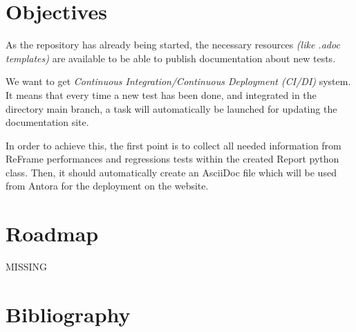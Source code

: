 \documentclass[12pt]{article}
\begin{document}
\newpage
\section{Objectives}
As the repository has already being started, the necessary resources \textit{(like .adoc templates)} are available
to be able to publish documentation about new tests.

We want to get \textit{Continuous Integration/Continuous Deployment (CI/DI)} system.
It means that every time a new test has been done, and integrated in the directory main branch, a task will 
automatically be launched for updating the documentation site.

In order to achieve this, the first point is to collect all needed information from ReFrame performances and regressions tests
within the created Report python class. Then, it should automatically create an AsciiDoc file which will be used from Antora
for the deployment on the website.



\newpage
\section{Roadmap}
MISSING

\newpage
\section{Bibliography}
\nocite{*}
\printbibliography[heading=none]
\end{document}
